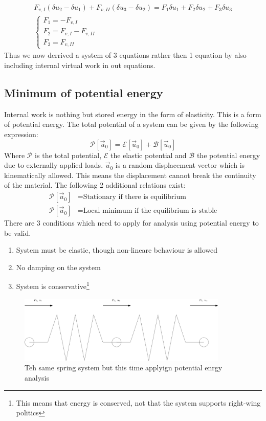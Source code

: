 \documentclass[11pt, a4paper]{article}
\numberwithin{equation}{section}
\numberwithin{figure}{section}
\begin{document}
\begin{gather}
  F_{v,I}(\delta u_2 - \delta u_1) + F_{v,II}(\delta u_3 - \delta u_2) = F_1\delta u_1 + F_2 \delta u_2 + F_3 \delta u_3\\
  \begin{cases}
    F_1 = -F_{v,I}\\
    F_2 = F_{v,I} - F_{v, II}\\
    F_3 = F_{v,II}
  \end{cases}
\end{gather}
Thus we now derrived a system of 3 equations rather then 1 equation by also including internal virtual work in out equations.



\subsection{Minimum of potential energy}
Internal work is nothing but stored energy in the form of elasticity. This is a form of potential energy. The total potential of a system can be given by the following expression:
\begin{equation*}
  \mathcal{P}[\vec{u}_0] = \mathcal{E}[\vec{u}_0] + \mathcal{B}[\vec{u}_0]
\end{equation*}
Where $\mathcal{P}$ is the total potential, $\mathcal{E}$ the elastic potential and $\mathcal{B}$ the potential energy due to externally applied loads. $\vec{u}_0$ is a random displacement vector which is kinematically allowed. This means the displacement cannot break the continuity of the material. The following 2 additional relations exist:
\begin{align}
  \mathcal{P}[\vec{u}_0] &= \text{Stationary if there is equilibrium}\\
  \mathcal{P}[\vec{u}_0] &= \text{Local minimum if the equilibrium is stable}
\end{align}
There are 3 conditions which need to apply for analysis using potential energy to be valid.
\begin{enumerate}
  \item System must be elastic, though non-lineare behaviour is allowed
  \item No damping on the system
  \item System is conservative\footnote{This means that energy is conserved, not that the system supports right-wing politics}
\end{enumerate}
\begin{figure}[H]
  \centerline{\includegraphics[width=100mm]{images/Springs.png}}
  \caption{Teh same spring system but this time applyign potential enrgy analysis}
\end{figure}
\end{document}
